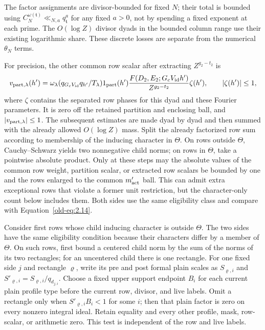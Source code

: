 \documentclass[12pt]{article}
\begin{document}
The factor assignments are divisor-bounded for fixed \(N\); their
total is bounded using \(C_N^{\omega(\mathfrak t)}
\ll_{N,a}q_{\mathfrak t}^a\) for any fixed \(a>0\), not by
spending a fixed exponent at each prime.  The \(O(\log Z)\) divisor
dyads in the bounded column range use their existing logarithmic share.
These discrete losses are separate from the numerical \(\theta_N\) terms.

For precision, the other common row scalar after extracting
\(Z^{g_2-t_2}\) is
\[
 v_{{\rm part},\lambda}(h')=
 \omega_\lambda(q_{G_cV_{\rm id}}q_{h'}/T_\lambda)
 1_{\rm part}(h')
 \frac{F(D_2,E_2;G_cV_{\rm id}h')}{Z^{g_2-t_2}}\zeta(h'),
 \qquad |\zeta(h')|\le1,
\]
where \(\zeta\) contains the separated row phases for this dyad and
these Fourier parameters.  It is zero off the retained partition and
enclosing ball, and \(|v_{{\rm part},\lambda}|\le1\).
The subsequent estimates are made dyad by dyad and then summed with
the already allowed \(O(\log Z)\) mass.  Split the already factorized row sum according to membership of the
inducing character in \(\Theta\).  On rows outside \(\Theta\),
Cauchy--Schwarz yields two nonnegative child norms; on rows in
\(\Theta\), take a pointwise absolute product.  Only at these steps
may the absolute values of the common row weight, partition scalar,
or extracted row scalars be bounded by one and the rows enlarged to
the common \(m'_{\rm act}\) ball.  This can admit extra exceptional
rows that violate a former unit restriction, but the character-only
count below includes them.  Both sides use the same eligibility class
and compare with Equation~\eqref{old-eq:2.14}.

Consider first rows whose child inducing character is outside
\(\Theta\).  The two sides have the same eligibility condition
because their characters differ by a member of \(\Theta\).
On such rows, first bound a centered child norm by the sum of the norms
of its two rectangles; for an uncentered child there is one rectangle.
For one fixed side \(j\) and rectangle \(\varrho\), write its pre and
post formal plain scales as \(S_{\varrho,i}\) and
\(S'_{\varrho,i}=S_{\varrho,i}/q_{d_{j,i}}\).  Choose a fixed upper
support endpoint \(B_i\) for each current plain profile type before
the current row, divisor, and live labels.  Omit a rectangle only when
\(S'_{\varrho,i}B_i<1\) for some \(i\); then that plain factor is zero
on every nonzero integral ideal.  Retain equality and every other profile,
mask, row-scalar, or arithmetic zero.  This test is independent of the
row and live labels.
\end{document}
